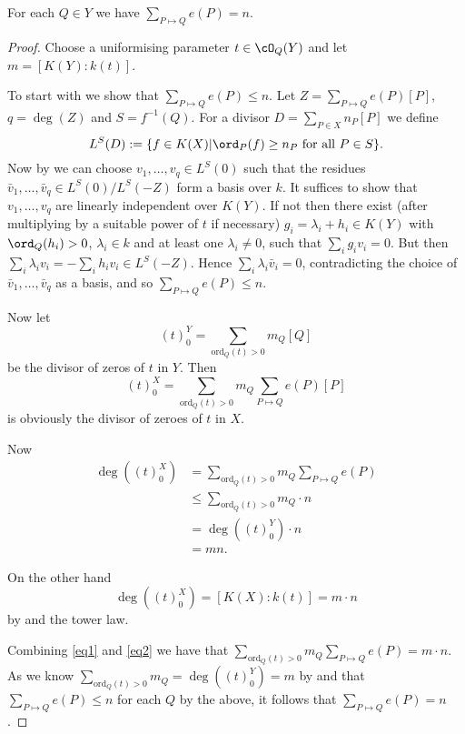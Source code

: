 \begin{prop}
	For each $Q\in Y$ we have $\sum_{P\mapsto Q}e(P)=n$.
\end{prop}
\begin{proof}
	Choose a uniformising parameter $t\in \cO_{Q}(Y)$ and let $m=[K(Y):k(t)]$.

	To start with we show that $\sum_{P\mapsto Q} e(P)\leq n$.
	Let $Z=\sum_{P\mapsto Q}e(P)[P]$, $q=\deg (Z)$ and $S=f^{-1}(Q)$. 
	For a divisor $D=\sum_{P\in X}n_P[P]$ we define 
		\[
			L^S(D):=\{f\in K(X)|\ord_P(f)\geq n_P\mbox{ for all }P\in S\}.
		\]
	Now by \citep[Lem 1, pg.193]{fulton} we can choose $v_{1},\ldots,v_{q}\in L^{S}(0)$ such that the residues $\bar{v}_{1},\ldots ,\bar{v}_{q}\in L^{S}(0)/L^{S}(-Z)$ form a basis over $k$. 
	It suffices to show that $v_{1},\ldots ,v_{q}$ are linearly independent over $K(Y)$.
	If not then there exist (after multiplying by a suitable power of $t$ if necessary) $g_{i}=\lambda_{i} +h_{i}\in K(Y)$ with $\ord_{Q}(h_{i})>0$,
	$\lambda_{i}\in k$ and at least one $\lambda_{i}\neq 0$, such that $\sum_{i}g_{i}v_{i}=0$.
	But then $\sum_{i}\lambda_{i}v_{i}=-\sum_{i}h_{i}v_{i}\in L^{S}(-Z)$. 
	Hence $\sum_{i}\lambda_{i}\bar{v}_{i}=0$, contradicting the choice of $\bar{v}_{1}, \ldots, \bar v_q$ as a basis, and so $\sum_{P\mapsto Q} e(P) \leq n$.

	Now let
		\[
			(t)_{0}^{Y}=\sum_{\textrm{ord}_{Q}(t)>0}m_{Q}[Q]
		\]
	be the divisor of zeros of $t$ in $Y$. Then
		\[
			(t)_{0}^{X}=\sum_{\textrm{ord}_{Q}(t)>0}m_{Q} \sum_{P\mapsto Q}e(P)[P]
		\]
	is obviously the divisor of zeroes of $t$ in $X$.

	Now
		\begin{align}
			\deg\left( (t)_{0}^{X} \right) & = \sum_{\textrm{ord}_{Q}(t)>0}m_{Q} \sum_{P\mapsto Q}e(P) \nonumber \\
			& \leq \sum_{\textrm{ord}_{Q}(t)>0}m_{Q} \cdot n \nonumber \\
			& = \deg\left((t)_{0}^{Y}\right)\cdot n \nonumber \\
			& = mn. %
		\end{align}
		
		
	On the other hand
		\begin{equation}
			\deg\left((t)_{0}^{X}\right)=[K(X):k(t)]=m\cdot n \label{eq2}
		\end{equation}
	by \cite[Prop 4, pg.194]{fulton} and the tower law.
	

	Combining \eqref{eq1} and \eqref{eq2} we have that $\sum_{\textrm{ord}_{Q}(t)>0}m_{Q} \sum_{P\mapsto Q}e(P)=m\cdot n$.
	As we know $\sum_{\textrm{ord}_{Q}(t)>0}m_{Q}=\deg\left((t)_{0}^{Y}\right)=m$ by \cite[prop 4, pg. 194]{fulton} and that $\sum_{P\mapsto Q}e(P)\leq n$ for each $Q$ by the above, it follows that $\sum_{P\mapsto Q} e(P)=n$. 
\end{proof}

